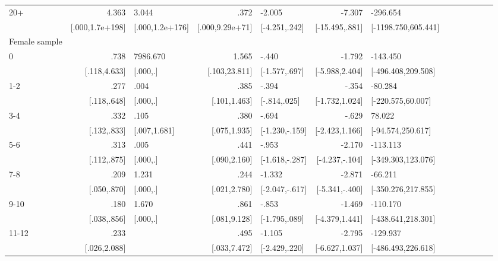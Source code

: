 \begin{table}[hp]
\begin{adjustbox}{max width=\linewidth}
\begin{threeparttable}
{\begin{tabular}{l*{6}{D{.}{.}{-1}l}}
20+             &           4.363&           3.044&            .372&          -2.005&          -7.307&        -296.654\\
                & [.000,1.7e+198]& [.000,1.2e+176]& [.000,9.29e+71]&   [-4.251,.242]&  [-15.495,.881]&[-1198.750,605.441]\\
\midrule
Female sample &&&&&&\\
0               &            .738&        7986.670&           1.565&           -.440&          -1.792&        -143.450\\
                &    [.118,4.633]&        [.000,.]&   [.103,23.811]&   [-1.577,.697]&  [-5.988,2.404]&[-496.408,209.508]\\

1-2             &            .277&            .004&            .385&           -.394&           -.354&         -80.284\\
                &     [.118,.648]&        [.000,.]&    [.101,1.463]&    [-.814,.025]&  [-1.732,1.024]&[-220.575,60.007]\\

3-4             &            .332&            .105&            .380&           -.694&           -.629&          78.022\\
                &     [.132,.833]&    [.007,1.681]&    [.075,1.935]&  [-1.230,-.159]&  [-2.423,1.166]&[-94.574,250.617]\\

5-6             &            .313&            .005&            .441&           -.953&          -2.170&        -113.113\\
                &     [.112,.875]&        [.000,.]&    [.090,2.160]&  [-1.618,-.287]&  [-4.237,-.104]&[-349.303,123.076]\\

7-8             &            .209&           1.231&            .244&          -1.332&          -2.871&         -66.211\\
                &     [.050,.870]&        [.000,.]&    [.021,2.780]&  [-2.047,-.617]&  [-5.341,-.400]&[-350.276,217.855]\\

9-10            &            .180&           1.670&            .861&           -.853&          -1.469&        -110.170\\
                &     [.038,.856]&        [.000,.]&    [.081,9.128]&   [-1.795,.089]&  [-4.379,1.441]&[-438.641,218.301]\\

11-12           &            .233&                &            .495&          -1.105&          -2.795&        -129.937\\
                &    [.026,2.088]&                &    [.033,7.472]&   [-2.429,.220]&  [-6.627,1.037]&[-486.493,226.618]\\


\end{tabular}}
\end{threeparttable}
\end{adjustbox}
\end{table}
